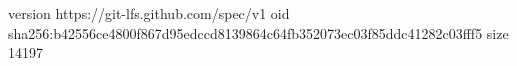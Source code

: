 version https://git-lfs.github.com/spec/v1
oid sha256:b42556ce4800f867d95edccd8139864c64fb352073ec03f85ddc41282c03fff5
size 14197
